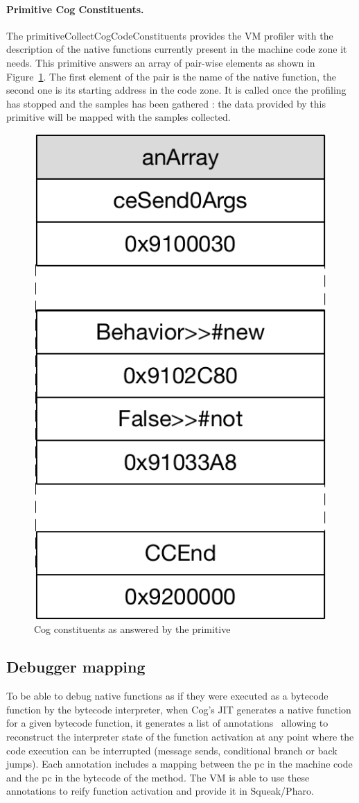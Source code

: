 \documentclass[10pt,preprint]{sigplanconf}
\newcommand{\figlabel}[1]{\label{fig:#1}}
\newcommand{\figref}[1]{Figure~\ref{fig:#1}}
\begin{document}
 
 \paragraph{Primitive Cog Constituents.}
The primitiveCollectCogCodeConstituents provides the VM profiler with the description of the native functions currently present in the machine code zone it needs. 
This primitive answers an array of pair-wise elements as shown in \figref{fig:ContentsOfCollectCogCodePrim}. The first element of the pair is the name of the native function, the second one is its starting address in the code zone.
It is called once the profiling has stopped and the samples has been gathered : the data provided by this primitive will be mapped with the samples collected.

 \begin{figure}[!htp]
     \begin{center}
         \includegraphics[width=0.4\linewidth]{ContentsOfCollectCogCodePrim}
         \caption{Cog constituents as answered by the primitive}
         \figlabel{fig:ContentsOfCollectCogCodePrim}
     \end{center}
 \end{figure}

 
\subsection{Debugger mapping}

To be able to debug native functions as if they were executed as a bytecode function by the bytecode interpreter, when Cog's JIT generates a native function for a given bytecode function, it generates a list of annotations~\cite{Ber16d} allowing to reconstruct the interpreter state of the function activation at any point where the code execution can be interrupted (message sends, conditional branch or back jumps). Each annotation includes a mapping between the pc in the machine code and the pc in the bytecode of the method. The VM is able to use these annotations to reify function activation and provide it in Squeak/Pharo.
 
\end{document}
